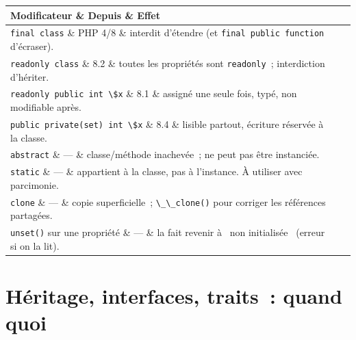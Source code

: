 \documentclass[12pt,a4paper,twoside,openright]{book}
\makeatletter
\newenvironment{tabz}[1]{\rowcolors{2}{white}{tralight}%
  \small\setlength{\tabcolsep}{5pt}\setlength{\LTpre}{3pt}\setlength{\LTpost}{3pt}%
  \begin{longtable}{@{}#1@{}}\toprule}
  {\bottomrule\end{longtable}\normalfont\setlength{\tabcolsep}{6pt}}
\newcommand{\thd}[1]{\textbf{\color{white}#1}}
\newcommand{\headrow}{\rowcolor{theadbg}}
\makeatother
\begin{document}
\begin{tabz}{llX}
  \headrow \thd{Modificateur} \& \thd{Depuis} \& \thd{Effet} \\
  \midrule
  \verb|final class| \& PHP 4/8 \& interdit d'\'etendre (et \verb|final public function| d'\'ecraser). \\
  \verb|readonly class| \& 8.2 \& toutes les propri\'et\'es sont \verb|readonly|~; interdiction d'h\'eriter. \\
  \verb|readonly public int \$x| \& 8.1 \& assign\'e une seule fois, typ\'e, non modifiable apr\`es. \\
  \verb|public private(set) int \$x| \& 8.4 \& lisible partout, \'ecriture r\'eserv\'ee \`a la classe. \\
  \verb|abstract| \& --- \& classe/m\'ethode inachev\'ee~; ne peut pas \^etre instanci\'ee. \\
  \verb|static| \& --- \& appartient \`a la classe, pas \`a l'instance. \`A utiliser avec parcimonie. \\
  \verb|clone| \& --- \& copie superficielle~; \verb|\_\_clone()| pour corriger les r\'ef\'erences partag\'ees. \\
  \verb|unset()| sur une propri\'et\'e \& --- \& la fait revenir \`a \og ~non initialis\'ee~ \fg{} (erreur si on la lit). \\
\end{tabz}

\section{H\'eritage, interfaces, traits~: quand quoi}
\end{document}
